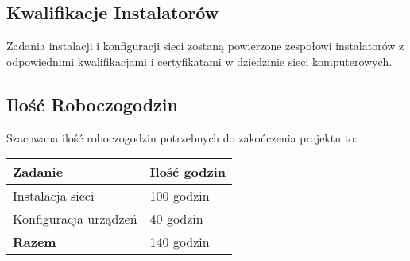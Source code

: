    \subsection{Kwalifikacje Instalatorów}
        Zadania instalacji i konfiguracji sieci zostaną powierzone zespołowi instalatorów z odpowiednimi kwalifikacjami i certyfikatami w dziedzinie sieci komputerowych.

    \subsection{Ilość Roboczogodzin}
        Szacowana ilość roboczogodzin potrzebnych do zakończenia projektu to:

        \begin{flushleft}
            \renewcommand{\arraystretch}{1.5}
            \begin{tabular}{|l|l|}
            \hline
                \textbf{Zadanie} & \textbf{Ilość godzin} \\
            \hline
                Instalacja sieci & 100 godzin \\
                Konfiguracja urządzeń & 40 godzin \\
            \hline
                \textbf{Razem} & 140 godzin \\
            \hline
            \end{tabular}
        \end{flushleft}

